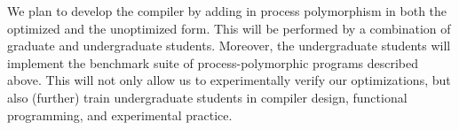 We plan to develop the compiler by adding in process polymorphism in both the optimized and the unoptimized form.
This will be performed by a combination of graduate and undergraduate students.
Moreover, the undergraduate students will implement the benchmark suite of process-polymorphic programs described above.
This will not only allow us to experimentally verify our optimizations, but also (further) train undergraduate students in compiler design, functional programming, and experimental practice.

